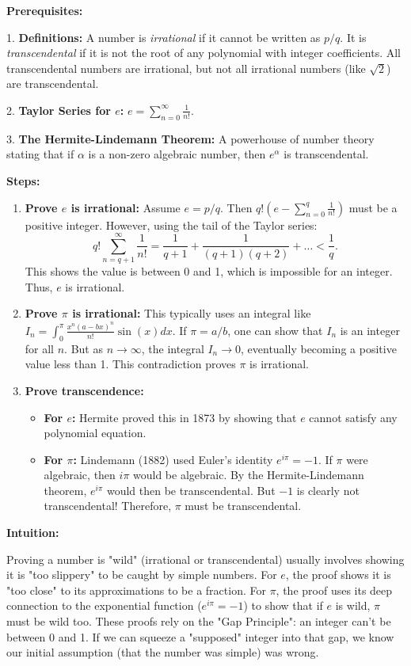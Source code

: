 \begin{solution}
\textbf{Prerequisites:}

1. \textbf{Definitions:} A number is \textit{irrational} if it cannot be written as $p/q$. It is \textit{transcendental} if it is not the root of any polynomial with integer coefficients. All transcendental numbers are irrational, but not all irrational numbers (like $\sqrt{2}$) are transcendental.

2. \textbf{Taylor Series for $e$:} $e = \sum_{n=0}^\infty \frac{1}{n!}$.

3. \textbf{The Hermite-Lindemann Theorem:} A powerhouse of number theory stating that if $\alpha$ is a non-zero algebraic number, then $e^\alpha$ is transcendental.


\textbf{Steps:}
\begin{enumerate}
    \item \textbf{Prove $e$ is irrational:}
        Assume $e = p/q$. Then $q!(e - \sum_{n=0}^q \frac{1}{n!})$ must be a positive integer. However, using the tail of the Taylor series:
        \[ q! \sum_{n=q+1}^\infty \frac{1}{n!} = \frac{1}{q+1} + \frac{1}{(q+1)(q+2)} + \dots < \frac{1}{q}. \]
        This shows the value is between 0 and 1, which is impossible for an integer. Thus, $e$ is irrational.

    \item \textbf{Prove $\pi$ is irrational:}
        This typically uses an integral like $I_n = \int_0^\pi \frac{x^n(a-bx)^n}{n!} \sin(x) dx$. If $\pi = a/b$, one can show that $I_n$ is an integer for all $n$. But as $n \to \infty$, the integral $I_n \to 0$, eventually becoming a positive value less than 1. This contradiction proves $\pi$ is irrational.

    \item \textbf{Prove transcendence:}
        \begin{itemize}
            \item \textbf{For $e$:} Hermite proved this in 1873 by showing that $e$ cannot satisfy any polynomial equation.
            \item \textbf{For $\pi$:} Lindemann (1882) used Euler's identity $e^{i\pi} = -1$. If $\pi$ were algebraic, then $i\pi$ would be algebraic. By the Hermite-Lindemann theorem, $e^{i\pi}$ would then be transcendental. But $-1$ is clearly not transcendental! Therefore, $\pi$ must be transcendental.
        \end{itemize}
\end{enumerate}


\textbf{Intuition:}

Proving a number is "wild" (irrational or transcendental) usually involves showing it is "too slippery" to be caught by simple numbers. For $e$, the proof shows it is "too close" to its approximations to be a fraction. For $\pi$, the proof uses its deep connection to the exponential function ($e^{i\pi}=-1$) to show that if $e$ is wild, $\pi$ must be wild too. These proofs rely on the "Gap Principle": an integer can't be between 0 and 1. If we can squeeze a "supposed" integer into that gap, we know our initial assumption (that the number was simple) was wrong.


\end{solution}

